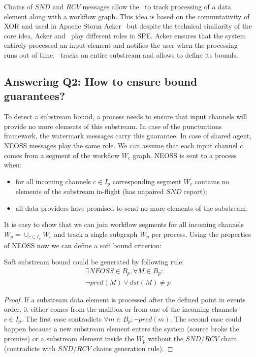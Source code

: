 Chains of $SND$ and $RCV$ messages allow the \tracker\ to track processing of a data element along with a workflow graph. This idea is based on the commutativity of XOR and used in Apache Storm Acker~\cite{apache:storm:acker} but despite the technical similarity of the core idea, Acker and \tracker\ play different roles in SPE. Acker ensures that the system entirely processed an input element and notifies the user when the processing runs out of time. \tracker\ tracks an entire substream and allows to define its bounds.

\subsection{Answering Q2: How to ensure bound guarantees?}
To detect a substream bound, a process needs to ensure that input channels will provide no more elements of this substream. In case of the punctuations framework, the watermark messages carry this guarantee. In case of shared agent, NEOSS messages play the same role. We can assume that each input channel $c$ comes from a segment of the workflow $W_c$ graph. NEOSS is sent to a process when:
\begin{itemize}
    \item for all incoming channels $c \in I_p$ corresponding segment $W_c$ contains no elements of the substream in-flight (has unpaired $SND$ report);
    \item all data providers have promised to send no more elements of the substream.
\end{itemize}
It is easy to show that we can join workflow segments for all incoming channels $W_p = \cup_{c\in I_p} W_c$ and track a single subgraph $W_p$ per process. Using the properties of NEOSS now we can define a soft bound criterion:
\begin{lemma}
Soft substream bound could be generated by following rule:
\begin{multline}
 \exists NEOSS \in B_p, \forall M\in B_p : \\ \neg pred(M) \vee dst(M) \ne p
\end{multline}
\end{lemma}
\begin{proof}
If a substream data element is processed after the defined point in events order, it either comes from the mailbox or from one of the incoming channels $c \in I_p$. The first case contradicts $\forall m\in B_p : \neg pred(m)$. The second case could happen because a new substream element enters the system (source broke the promise) or a substream element inside the $W_p$ without the $SND$/$RCV$ chain (contradicts with $SND$/$RCV$ chains generation rule). 
\end{proof}

